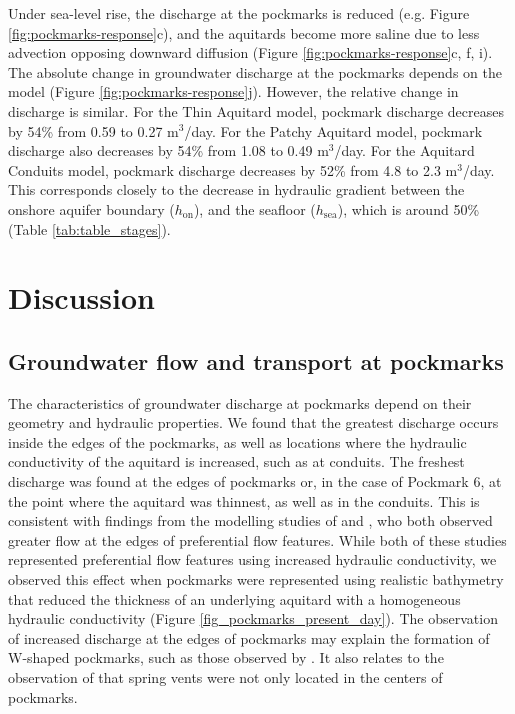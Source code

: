 \documentclass[draft, 10pt]{agujournal2019}
\begin{document}
Under sea-level rise, the discharge at the pockmarks is reduced (e.g. Figure \ref{fig:pockmarks-response}c),
and the aquitards become more saline due to less advection opposing downward diffusion (Figure \ref{fig:pockmarks-response}c, f, i).
The absolute change in groundwater discharge at the pockmarks depends on the model (Figure \ref{fig:pockmarks-response}j).
However, the relative change in discharge is similar. For the Thin Aquitard model, pockmark discharge decreases by 54\% from 0.59 to 0.27 m$^3$/day.
For the Patchy Aquitard model, pockmark discharge also decreases by 54\% from 1.08 to 0.49 m$^3$/day.
For the Aquitard Conduits model, pockmark discharge decreases by 52\% from 4.8 to 2.3 m$^3$/day.
This corresponds closely to the decrease in hydraulic gradient between the onshore aquifer boundary ($h_{\mathrm{on}}$), and the seafloor ($h_{\mathrm{sea}}$),
which is around 50\% (Table \ref{tab:table_stages}).

\section{Discussion}

\subsection{Groundwater flow and transport at pockmarks}
The characteristics of groundwater discharge at pockmarks depend on their geometry and hydraulic properties.
We found that the greatest discharge occurs inside the edges of the pockmarks, as well as locations where the hydraulic conductivity of the aquitard is increased, such as at conduits.
The freshest discharge was found at the edges of pockmarks or, in the case of Pockmark 6, at the point where the aquitard was thinnest, as well as in the conduits.
This is consistent with findings from the modelling studies of  and , who both observed greater flow at the edges of preferential flow features.
While both of these studies represented preferential flow features using increased hydraulic conductivity,
we observed this effect when pockmarks were represented using realistic bathymetry that reduced the thickness of an underlying aquitard with a homogeneous hydraulic conductivity (Figure \ref{fig_pockmarks_present_day}).
The observation of increased discharge at the edges of pockmarks may explain the formation of W-shaped pockmarks, such as those observed by .
It also relates to the observation of  that spring vents were not only located in the centers of pockmarks.
\end{document}
